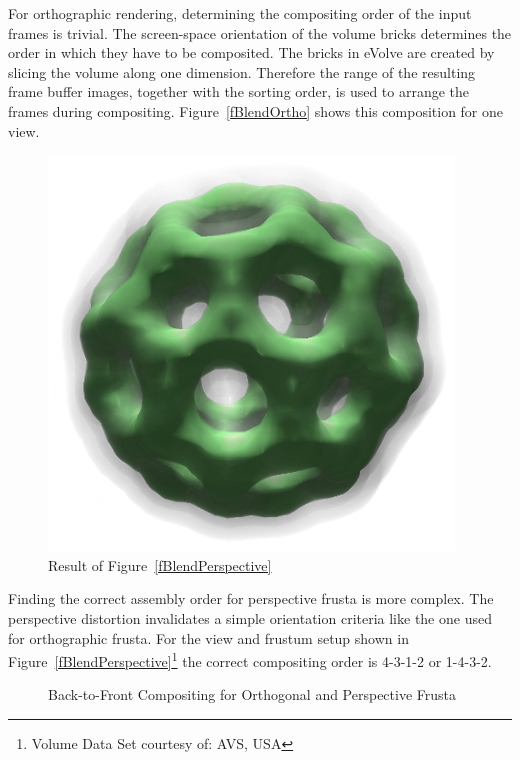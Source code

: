 \documentclass[10pt,a4]{scrartcl}
\newcommand{\fig}[1]{Figure~\ref{#1}}
\begin{document}
For orthographic rendering, determining the compositing order of the
input frames is trivial. The screen-space orientation of the volume
bricks determines the order in which they have to be composited. The
bricks in \textsf{eVolve} are created by slicing the volume along one
dimension. Therefore the range of the resulting frame buffer images,
together with the sorting order, is used to arrange the frames during
compositing. \fig{fBlendOrtho} shows this composition for one view.

\begin{figure}
  \includegraphics[width=.382\textwidth]{images/volResult.png}
  {\caption{\label{fVolResult}Result of \fig{fBlendPerspective}}}
\end{figure}
Finding the correct assembly order for perspective frusta is more
complex. The perspective distortion invalidates a simple orientation
criteria like the one used for orthographic frusta. For the view and
frustum setup shown in \fig{fBlendPerspective}\footnote{Volume Data Set
  courtesy of: AVS, USA} the correct compositing order is 4-3-1-2 or
1-4-3-2.

\begin{figure}[h!t]
  \hfil
  {\caption{\label{fBlend}Back-to-Front Com\-po\-siting for
      Orthogonal and Perspective Frusta}}
\end{figure}
\end{document}
